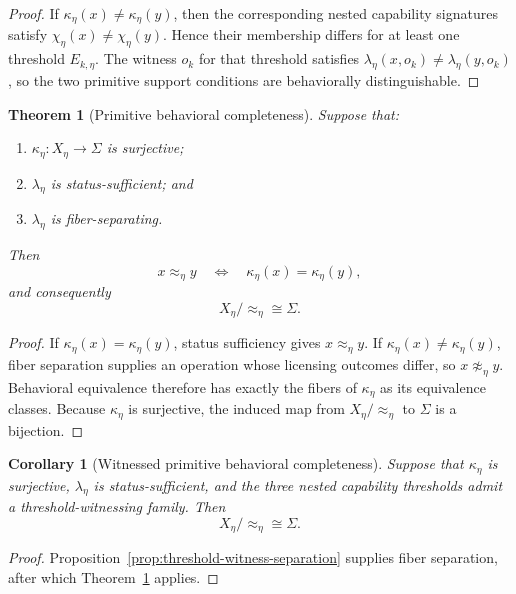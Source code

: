 \documentclass[11pt]{article}
\newtheorem{theorem}[proposition]{Theorem}
\newtheorem{corollary}[proposition]{Corollary}
\theoremstyle{definition}
\theoremstyle{remark}
\begin{document}
\begin{proof}
If \(\kappa_{\eta}(x)\neq\kappa_{\eta}(y)\), then the corresponding nested capability signatures satisfy \(\chi_{\eta}(x)\neq\chi_{\eta}(y)\). Hence their membership differs for at least one threshold \(E_{k,\eta}\). The witness \(o_k\) for that threshold satisfies \(\lambda_{\eta}(x,o_k)\neq\lambda_{\eta}(y,o_k)\), so the two primitive support conditions are behaviorally distinguishable.
\end{proof}

\begin{theorem}[Primitive behavioral completeness]
\label{thm:primitive-behavioral-completeness}
Suppose that:

\begin{enumerate}[leftmargin=1.5em]
    \item \(\kappa_{\eta}:X_{\eta}\rightarrow\Sigma\) is surjective;
    \item \(\lambda_{\eta}\) is status-sufficient; and
    \item \(\lambda_{\eta}\) is fiber-separating.
\end{enumerate}

Then
\[
x\approx_{\eta}y
\quad\Longleftrightarrow\quad
\kappa_{\eta}(x)=\kappa_{\eta}(y),
\]
and consequently
\[
X_{\eta}/{\approx_{\eta}}
\cong
\Sigma.
\]
\end{theorem}

\begin{proof}
If \(\kappa_{\eta}(x)=\kappa_{\eta}(y)\), status sufficiency gives \(x\approx_{\eta}y\). If \(\kappa_{\eta}(x)\neq\kappa_{\eta}(y)\), fiber separation supplies an operation whose licensing outcomes differ, so \(x\not\approx_{\eta}y\). Behavioral equivalence therefore has exactly the fibers of \(\kappa_{\eta}\) as its equivalence classes. Because \(\kappa_{\eta}\) is surjective, the induced map from \(X_{\eta}/{\approx_{\eta}}\) to \(\Sigma\) is a bijection.
\end{proof}

\begin{corollary}[Witnessed primitive behavioral completeness]
\label{cor:witnessed-primitive-behavioral-completeness}
Suppose that \(\kappa_{\eta}\) is surjective, \(\lambda_{\eta}\) is status-sufficient, and the three nested capability thresholds admit a threshold-witnessing family. Then
\[
X_{\eta}/{\approx_{\eta}}\cong\Sigma.
\]
\end{corollary}

\begin{proof}
Proposition~\ref{prop:threshold-witness-separation} supplies fiber separation, after which Theorem~\ref{thm:primitive-behavioral-completeness} applies.
\end{proof}
\end{document}
